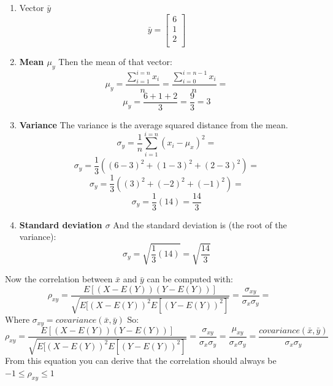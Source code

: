 \begin{enumerate}
    \item Vector $\bar{y}$
        \begin{equation}
            \bar{y}=
            \begin{bmatrix}
            6\\
            1\\
            2\\
            \end{bmatrix}
        \end{equation}
    \item \textbf{Mean $\mu_y$}
        Then the mean of that vector:
        \begin{equation}
            \mu_y =\frac{\sum_{i=1}^{i=n}{x_i}}{n}= \frac{\sum_{i=0}^{i=n-1}{x_i}}{n}=
        \end{equation}
        \begin{equation}
            \mu_y=\frac{6+1+2}{3}=\frac{9}{3}=3
        \end{equation}
    \item \textbf{Variance}
        The variance is the average squared distance from the mean.
        \begin{equation}
            \sigma_y=\frac{1}{n}\sum_{i=1}^{i=n}{({x_i}-\mu_x)}^2=
        \end{equation}
        \begin{equation}
            \sigma_y=\frac{1}{3}({(6-3)}^2+{(1-3)}^2+{(2-3)}^2)=
        \end{equation}
        \begin{equation}
            \sigma_y=\frac{1}{3}({(3)}^2+{(-2)}^2+{(-1)}^2)=
        \end{equation}
        \begin{equation}
            \sigma_y=\frac{1}{3}(14)=\frac{14}{3}
        \end{equation}
    \item \textbf{Standard deviation $\sigma$}
        And the standard deviation is (the root of the variance):
        \begin{equation}
            \sigma_y=\sqrt{\frac{1}{3}(14)}=\sqrt{\frac{14}{3}}
        \end{equation}
\end{enumerate}
Now the correlation between $\bar{x}$ and $\bar{y}$ can be computed with:
\begin{equation}
    \rho_{xy}=\frac{E[(X-E(Y))(Y-E(Y))]}{\sqrt{E{[{(X-E(Y))}^2E[{(Y-E(Y))}^2]}}}=\frac{\sigma_{xy}}{\sigma_x\sigma_y}=
\end{equation}
Where $\sigma_{xy}=covariance(\bar{x},\bar{y})$  So:
\begin{equation}
    \rho_{xy}=\frac{E[(X-E(Y))(Y-E(Y))]}{\sqrt{E{[{(X-E(Y))}^2E[{(Y-E(Y))}^2]}}}=\frac{\sigma_{xy}}{\sigma_x\sigma_y}=\frac{\mu_{xy}}{\sigma_x\sigma_y}=\frac{covariance(\bar{x},\bar{y})}{\sigma_x\sigma_y}
\end{equation}
From this equation you can derive that the correlation should always be $-1\leq \rho_{xy} \leq 1$

